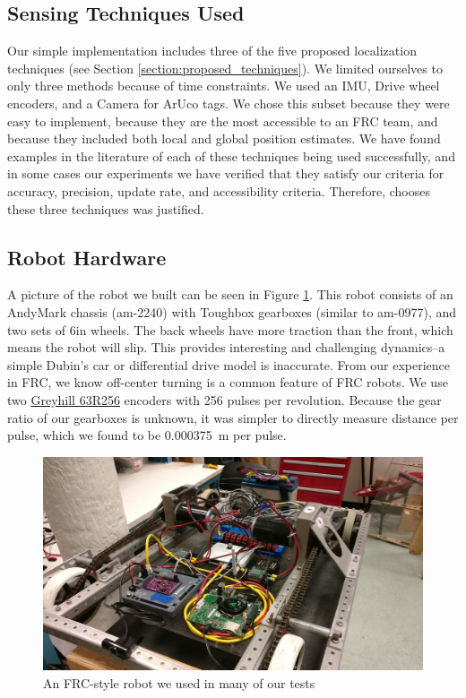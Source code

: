 \documentclass{article}
\begin{document}
  \subsection{Sensing Techniques Used}\label{section:techniques_used}

    Our simple implementation includes three of the five proposed localization techniques (see Section \ref{section:proposed_techniques}). We limited ourselves to only three methods because of time constraints. We used an IMU, Drive wheel encoders, and a Camera for ArUco tags. We chose this subset because they were easy to implement, because they are the most accessible to an FRC team, and because they included both local and global position estimates. We have found examples in the literature of each of these techniques being used successfully, and in some cases our experiments we have verified that they satisfy our criteria for accuracy, precision, update rate, and accessibility criteria. Therefore, chooses these three techniques was justified.

	\subsection{Robot Hardware}

    A picture of the robot we built can be seen in Figure \ref{fig:mocap_robot}. This robot consists of an AndyMark chassis (am-2240) with Toughbox gearboxes (similar to am-0977), and two sets of 6in wheels. The back wheels have more traction than the front, which means the robot will slip. This provides interesting and challenging dynamics--a simple Dubin's car or differential drive model is inaccurate. From our experience in FRC, we know off-center turning is a common feature of FRC robots. We use two \href{https://www.digikey.com/product-detail/en/grayhill-inc/63R256/GH3070-ND/304479}{Greyhill 63R256} encoders with 256 pulses per revolution. Because the gear ratio of our gearboxes is unknown, it was simpler to directly measure distance per pulse, which we found to be \SI{0.000375}{\meter} per pulse.

    \begin{figure}[H]
      \centering
      \includegraphics[width=1\linewidth]{./images/mocap_robot.jpg}
      \caption{An FRC-style robot we used in many of our tests}
      \label{fig:mocap_robot}
    \end{figure}
\end{document}
